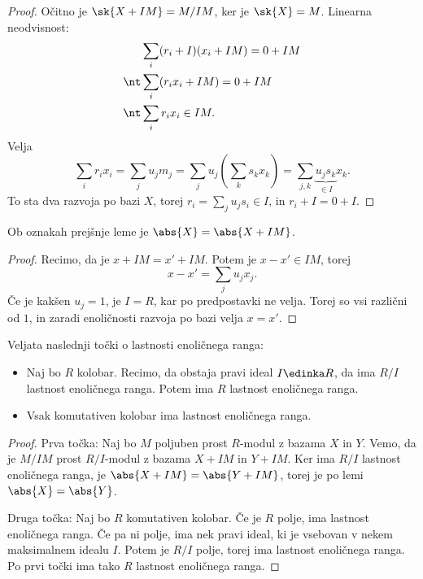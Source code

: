 \begin{proof}
  Očitno je $\sk{X + IM} = M/IM$, ker je $\sk{X} = M$.
  Linearna neodvisnost:
  \begin{align*}
	& \sum_i (r_i + I) (x_i + IM) = 0 + IM \\
	\nt& \sum_i (r_i x_i + IM) = 0 + IM \\
	\nt& \sum_i r_i x_i \in IM.
  \end{align*}
  Velja
  \[
	\sum_i r_i x_i = \sum_j u_j m_j = \sum_j u_j \left( \sum_k s_k x_k \right)
	= \sum_{j,k} \underbrace{u_j s_k}_{\in I} x_k.
  \]
  To sta dva razvoja po bazi $X$, torej $r_i = \sum_j u_j s_i \in I$, in $r_i +
  I = 0 + I$.
\end{proof}


\begin{lema}
  Ob oznakah prejšnje leme je $\abs{X} = \abs{X + IM}$.
\end{lema}

\begin{proof}
  Recimo, da je $x + IM = x' + IM$.
  Potem je $x - x' \in IM$, torej
  \[
	x - x' = \sum_j u_j x_j.
  \]
  Če je kakšen $u_j = 1$, je $I = R$, kar po predpostavki ne velja.
  Torej so vsi različni od $1$, in zaradi enoličnosti razvoja po bazi velja $x =
  x'$.
\end{proof}

\begin{izrek}
  Veljata naslednji točki o lastnosti enoličnega ranga:
  \begin{itemize}
  \item Naj bo $R$ kolobar.
	Recimo, da obstaja pravi ideal $I \edinka R$, da ima $R/I$ lastnost
	enoličnega ranga.
	Potem ima $R$ lastnost enoličnega ranga.
  \item Vsak komutativen kolobar ima lastnost enoličnega ranga.
  \end{itemize}
\end{izrek}

\begin{proof}
  Prva točka:
  Naj bo $M$ poljuben prost $R$-modul z bazama $X$ in $Y$.
  Vemo, da je $M/IM$ prost $R/I$-modul z bazama $X + IM$ in $Y + IM$.
  Ker ima $R/I$ lastnost enoličnega ranga, je $\abs{X + IM} = \abs{Y + IM}$,
  torej je po lemi $\abs{X} = \abs{Y}$.

  Druga točka:
  Naj bo $R$ komutativen kolobar.
  Če je $R$ polje, ima lastnost enoličnega ranga.
  Če pa ni polje, ima nek pravi ideal, ki je vsebovan v nekem maksimalnem idealu
  $I$.
  Potem je $R/I$ polje, torej ima lastnost enoličnega ranga.
  Po prvi točki ima tako $R$ lastnost enoličnega ranga.
\end{proof}


